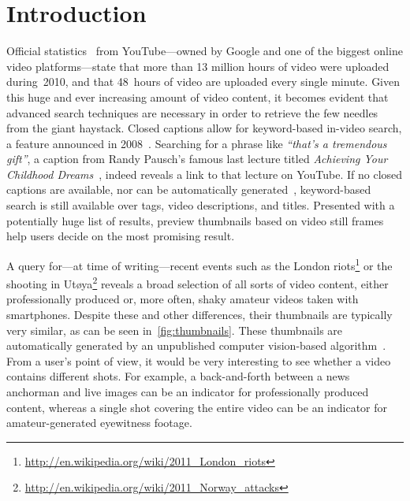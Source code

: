 \documentclass[runningheads,a4paper]{llncs}
\begin{document}
\section{Introduction}
Official statistics~\cite{youtube:stats} from YouTube---owned by Google and one of the biggest online video platforms---state that more than 13 million hours of video were uploaded during~2010, and that 48~hours of video are uploaded every single minute. Given this huge and ever increasing amount of video content, it becomes evident that advanced search techniques are necessary in order to retrieve the few needles from the giant haystack. Closed captions allow for keyword-based in-video search, a feature announced \linebreak in 2008~\cite{googlevideo}. Searching for a phrase like \emph{``that's a tremendous gift''}, a caption from Randy Pausch's famous last lecture titled \emph{Achieving Your Childhood Dreams}~\cite{pausch}, indeed reveals a link to that lecture on YouTube. If no closed captions are available, nor can be automatically generated~\cite{youtubecaptions}, keyword-based search is still available over tags, video descriptions, and titles. Presented with a potentially huge list of results, preview thumbnails based on video still frames help users decide on the most promising result.

A query for---at time of writing---recent events such as the London riots\footnote{\url{http://en.wikipedia.org/wiki/2011_London_riots}} or the shooting in Ut\o ya\footnote{\url{http://en.wikipedia.org/wiki/2011_Norway_attacks}} reveals a broad selection of all sorts of video content, either professionally produced or, more often, shaky amateur videos taken with smartphones. Despite these and other differences, their thumbnails are typically very similar, as can be seen in~\autoref{fig:thumbnails}. These thumbnails are automatically generated by an unpublished computer vision-based algorithm~\cite{googleresearch}. From a user's point of view, it would be very interesting to see whether a video contains different shots. For example, a back-and-forth between a news anchorman and live images can be an indicator for professionally  produced content, whereas a single shot covering the entire video can be an indicator for amateur-generated eyewitness footage.
\end{document}
